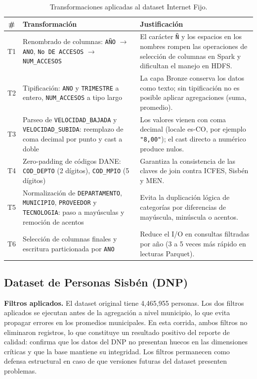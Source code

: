 \begin{table}[H]
\centering
\caption{Transformaciones aplicadas al dataset Internet Fijo.}
\begin{tabularx}{\textwidth}{c l X}
\toprule
\textbf{\#} & \textbf{Transformación} & \textbf{Justificación} \\
\midrule
T1 & Renombrado de columnas: \texttt{AÑO} $\rightarrow$ \texttt{ANO}, \texttt{No DE ACCESOS} $\rightarrow$ \texttt{NUM\_ACCESOS} & El carácter \texttt{Ñ} y los espacios en los nombres rompen las operaciones de selección de columnas en Spark y dificultan el manejo en HDFS. \\
T2 & Tipificación: \texttt{ANO} y \texttt{TRIMESTRE} a entero, \texttt{NUM\_ACCESOS} a tipo largo & La capa Bronze conserva los datos como texto; sin tipificación no es posible aplicar agregaciones (suma, promedio). \\
T3 & Parseo de \texttt{VELOCIDAD\_BAJADA} y \texttt{VELOCIDAD\_SUBIDA}: reemplazo de coma decimal por punto y cast a doble & Los valores vienen con coma decimal (locale es-CO, por ejemplo \texttt{"8,00"}); el cast directo a numérico produce nulos. \\
T4 & Zero-padding de códigos DANE: \texttt{COD\_DEPTO} (2 dígitos), \texttt{COD\_MPIO} (5 dígitos) & Garantiza la consistencia de las claves de join contra ICFES, Sisbén y MEN. \\
T5 & Normalización de \texttt{DEPARTAMENTO}, \texttt{MUNICIPIO}, \texttt{PROVEEDOR} y \texttt{TECNOLOGIA}: paso a mayúsculas y remoción de acentos & Evita la duplicación lógica de categorías por diferencias de mayúscula, minúscula o acentos. \\
T6 & Selección de columnas finales y escritura particionada por \texttt{ANO} & Reduce el I/O en consultas filtradas por año (3 a 5 veces más rápido en lecturas Parquet). \\
\bottomrule
\end{tabularx}
\end{table}

\subsection{Dataset de Personas Sisbén (DNP)}

\textbf{Filtros aplicados.} El dataset original tiene 4,465,955 personas. Los dos filtros aplicados se ejecutan antes de la agregación a nivel municipio, lo que evita propagar errores en los promedios municipales. En esta corrida, ambos filtros no eliminaron registros, lo que constituye un resultado positivo del reporte de calidad: confirma que los datos del DNP no presentan huecos en las dimensiones críticas y que la base mantiene su integridad. Los filtros permanecen como defensa estructural en caso de que versiones futuras del dataset presenten problemas.

